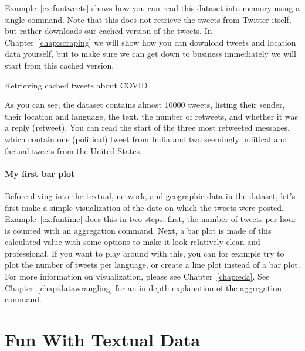 Example~\ref{ex:funtweets} shows how you can read this dataset into memory using a single command.
Note that this does not retrieve the tweets from Twitter itself, but rather downloads
our cached version of the tweets.
In Chapter~\ref{chap:scraping} we will show how you can download tweets and location data yourself, but to make sure
we can get down to business immediately we will start from this cached version. 

\begin{ccsexample}
\caption{Retrieving cached tweets about COVID}\label{ex:funtweets}
\end{ccsexample}

As you can see, the dataset contains almost 10000 tweets, listing their
sender, their location and language, the text, the number of retweets, and whether it was a reply (retweet).
You can read the start of the three most retweeted messages, which contain one (political) tweet from India
and two seemingly political and factual tweets from the United States.

\paragraph{My first bar plot} Before diving into the textual, network, and geographic data in the dataset,
let's first make a simple visualization of the date on which the tweets were posted.
Example~\ref{ex:funtime} does this in two steps:
first, the number of tweets per hour is counted with an aggregation command.
Next, a bar plot is made of this calculated value with some options to make it look relatively clean and professional.
If you want to play around with this, you can for example try to plot the number of tweets per language,
or create a line plot instead of a bar plot. 
For more information on visualization, please see Chapter~\ref{chap:eda}.
See Chapter~\ref{chap:datawrangling} for an in-depth explanation of the aggregation command. 


\section{Fun With Textual Data}

